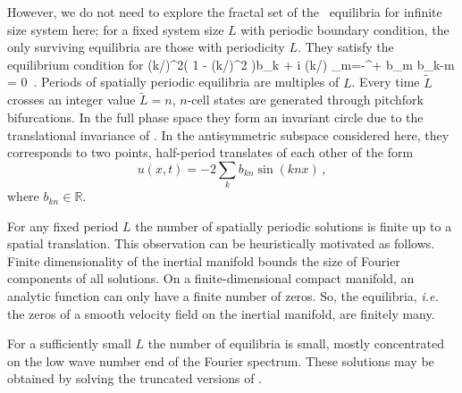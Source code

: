However, we do not need to explore the fractal set of the 
\KS\ equilibria for infinite size system here;
for a fixed system size
$L$ with periodic boundary condition, the only surviving equilibria  are
those with periodicity $L$.
They satisfy 
the equilibrium condition for 
\beq
(k/)^2\left( 1 - (k/)^2  \right)b_k 
	 + i (k/) \sum_{m=-\infty}^{+\infty} b_m b_{k-m} = 0
\,.
\label{eq:stfks}
\eeq 
Periods of spatially periodic equilibria are multiples of $L$.
Every time $\tilde{L}$ crosses an integer value  $\tilde{L}=n$,
$n$-cell states
are generated through pitchfork bifurcations. 
In the full phase space they
form an invariant circle due to the translational invariance of . 
In the antisymmetric subspace considered here, they corresponds to two points,
half-period translates of each other of the form
\[
u(x,t)=-2\sum_k b_{kn}\sin (knx) \,,
\]
where $b_{kn} \in \mathbb{R}$.

For any fixed period $L$
the number 
of spatially periodic solutions is finite up to a spatial translation.
This observation can be heuristically motivated as follows. 
Finite dimensionality of the inertial manifold
bounds the size of Fourier components of all solutions.
On a finite-dimensional compact manifold,
an analytic function can only have a finite number
of zeros. So, the equilibria, {\em i.e.}
the zeros of a smooth velocity field on
the inertial manifold, are finitely many.

For a sufficiently small $L$ 
the number of equilibria is small,
mostly
concentrated on the low wave number end of the Fourier spectrum.
These solutions may
be obtained by solving the truncated versions of . 

